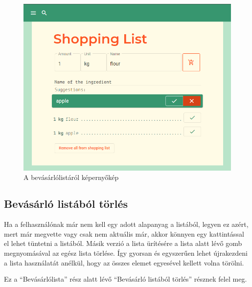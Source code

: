 \documentclass[12pt]{report}
\theoremstyle{definition}
\begin{document}
\begin{figure}[H]%
    \centering
    \includegraphics[width=11.5cm]{pictures/web-shoppinglist.png}
	\caption{A bevásárlólistáról képernyőkép}%
    \label{fig:shoppinglist}%
\end{figure}


\subsection{Bevásárló listából törlés}
Ha a felhasználónak már nem kell egy adott alapanyag a listából, legyen ez azért, mert már megvette vagy csak nem aktuális már, akkor könnyen egy kattintással el lehet tüntetni a listából. Másik verzió a lista ürítésére a lista alatt lévő gomb megnyomásával az egész lista törlése. Így gyorsan és egyszerűen lehet újrakezdeni a lista használatát anélkül, hogy az összes elemet egyesével kellett volna törölni.

Ez  a “Bevásárlólista” rész alatt lévő “Bevásárló listából törlés” résznek felel meg. 




\end{document}
